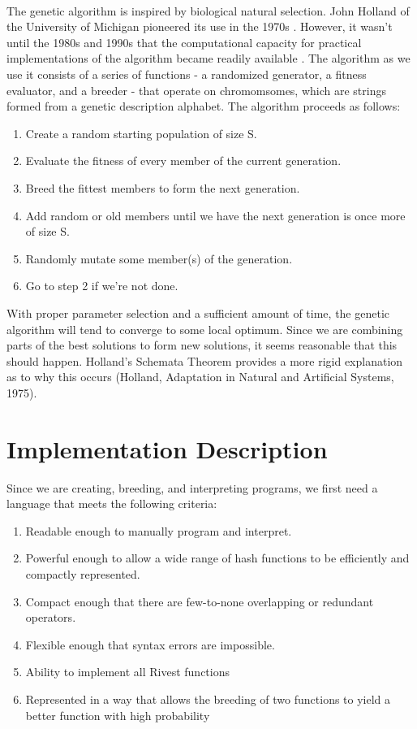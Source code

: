\documentclass{article}
\begin{document}
\paragraph{}
The genetic algorithm is inspired by biological natural selection. John Holland of the University of Michigan pioneered its use in the 1970s \cite{Holland1973}.
However, it wasn't until the 1980s and 1990s that the computational capacity for practical implementations of the algorithm became readily available \cite{Goldberg}. The algorithm as we use it consists of a series of functions - a randomized generator, a fitness evaluator, and a breeder - that operate on chromomsomes, which are strings formed from a genetic description alphabet. The algorithm proceeds as follows:
\begin{enumerate}
	\item Create a random starting population of size S.
	\item Evaluate the fitness of every member of the current generation.
	\item Breed the fittest members to form the next generation.
	\item Add random or old members until we have the next generation is once more of size S.
	\item Randomly mutate some member(s) of the generation.
	\item Go to step 2 if we're not done.
\end{enumerate}

With proper parameter selection and a sufficient amount of time, the genetic algorithm will tend to converge to some local optimum. Since we are combining parts of the best solutions to form new solutions, it seems reasonable that this should happen. Holland's Schemata Theorem provides a more rigid explanation as to why this occurs (Holland, Adaptation in Natural and Artificial Systems, 1975).

\section{Implementation Description}
Since we are creating, breeding, and interpreting programs, we first need a language that meets the following criteria:

\begin{enumerate}
\item Readable enough to manually program and interpret.
\item Powerful enough to allow a wide range of hash functions to be efficiently and compactly represented.
\item Compact enough that there are few-to-none overlapping or redundant operators.
\item Flexible enough that syntax errors are impossible.
\item Ability to implement all Rivest functions
\item Represented in a way that allows the breeding of two functions to yield a better function with high probability
\end{enumerate}
\end{document}
